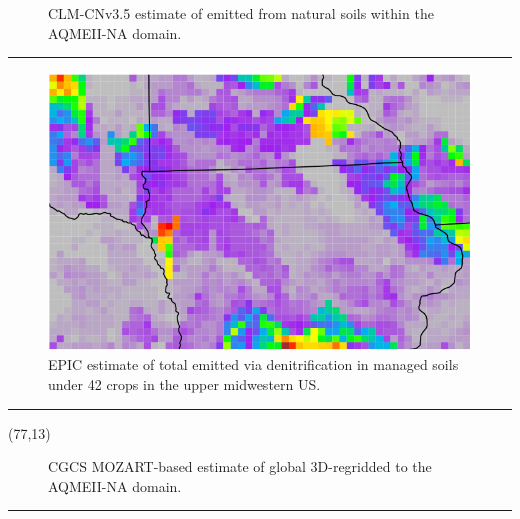 \documentclass{a0poster} %
\begin{document}
\begin{textblock}{30}
\begin{figure}[h!]
  \centering
    \placeholder{838px}{486px}
    \caption{CLM-CNv3.5 estimate of  emitted from natural soils within the AQMEII-NA domain.}
\end{figure}
\vspace{-20mm}\rule{\textwidth}{1pt}

\begin{figure}[h!]
  \centering
    \includegraphics[scale=1.0]{EPIC_window_all_crops}
    \caption{EPIC estimate of total  emitted via denitrification in managed soils under 42 crops in the upper midwestern US.}
\end{figure}
\vspace{-20mm}\rule{\textwidth}{1pt}

\end{textblock} %

\begin{textblock}{30}(77,13)

\begin{figure}[h!]
  \centering
    \placeholder{838px}{2900px}
    \caption{CGCS MOZART-based estimate of global  3D-regridded to the AQMEII-NA domain.}
\end{figure}
\vspace{-20mm}\rule{\textwidth}{1pt}

\end{textblock} %
\end{document}
